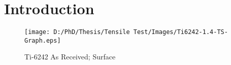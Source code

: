 \chapter{Introduction}

\begin{figure}[H]
    \centering
        \texttt{[image: D:/PhD/Thesis/Tensile Test/Images/Ti6242-1.4-TS-Graph.eps]}
        \caption{Ti-6242 As Received; Surface}
    \label{fig:EDM-Cut}
\end{figure}